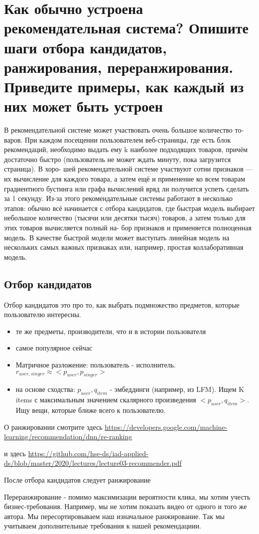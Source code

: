 	\section{Как обычно устроена рекомендательная система? Опишите шаги отбора кандидатов, ранжирования, переранжирования. Приведите примеры, как каждый из них может быть устроен
} 



В рекомендательной системе может участвовать очень большое количество то- варов. При каждом посещении пользователем веб-страницы, где есть блок рекомендаций, необходимо выдать ему k наиболее подходящих товаров, причём достаточно быстро (пользователь не может ждать минуту, пока загрузится страница). В хоро- шей рекомендательной системе участвуют сотни признаков — их вычисление для каждого товара, а затем ещё и применение ко всем товарам градиентного бустинга или графа вычислений вряд ли получится успеть сделать за 1 секунду. Из-за этого рекомендательные системы работают в несколько этапов: обычно всё начинается с отбора кандидатов, где быстрая модель выбирает небольшое количество (тысячи или десятки тысяч) товаров, а затем только для этих товаров вычисляется полный на- бор признаков и применяется полноценная модель. В качестве быстрой модели может выступать линейная модель на нескольких самых важных признаках или, например, простая коллаборативная модель.

\subsection{Отбор кандидатов}

Отбор кандидатов это про то, как выбрать подмножество предметов, которые пользователю интересны. 

\begin{itemize}
    \item те же предметы, производители, что и в истории пользователя 
    
    \item самое популярное сейчас
    
    \item Матричное разложение: пользователь - исполнитель. $r_{user, singer} \approx <p_{user}, p_{singer} >$
    
    \item на основе сходства: $p_{user}, q_{item}$  -  эмбеддинги (например, из LFM). Ищем K items с максимальным значением скалярного произведения $<p_{user}, q_{item}>$. Ищу вещи, которые ближе всего к пользователю. 
    
    
\end{itemize}


О ранжировании  смотрите здесь
\url{https://developers.google.com/machine-learning/recommendation/dnn/re-ranking}

и здесь \url{https://github.com/hse-ds/iad-applied-ds/blob/master/2020/lectures/lecture03-recommender.pdf}

После отбора кандидатов следует ранжирование

Переранжирование - помимо максимизации вероятности клика, мы хотим учесть бизнес-требования. Например, мы не хотим показать видео от одного и того же автора. Мы пересортировываем наш изначальное ранжирование. Так мы учитываем дополнительные требования к нашей рекомендациии. 
